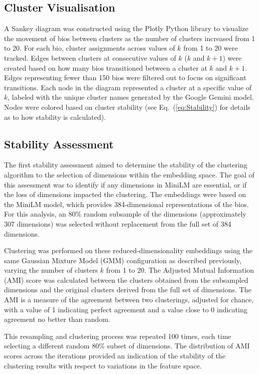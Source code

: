 \documentclass{article}
\begin{document}
\subsection*{Cluster Visualisation}

A Sankey diagram was constructed using the Plotly Python library to visualize the movement of bios between clusters as the number of clusters increased from 1 to 20. For each bio, cluster assignments across values of $k$ from 1 to 20 were tracked. Edges between clusters at consecutive values of $k$ ($k$ and $k+1$) were created based on how many bios transitioned between a cluster at $k$ and $k + 1$. Edges representing fewer than 150 bios were filtered out to focus on significant transitions. Each node in the diagram represented a cluster at a specific value of $k$, labeled with the unique cluster names generated by the Google Gemini model. Nodes were colored based on cluster stability (see Eq.~(\ref{eq:Stability}) for details as to how stability is calculated).




\subsection*{Stability Assessment}

The first stability assessment aimed to determine the stability of the clustering algorithm to the selection of dimensions within the embedding space.  The goal of this assessment was to identify if any dimensions in MiniLM are essential, or if the loss of dimensions impacted the clustering. The embeddings were based on the MiniLM model, which provides 384-dimensional representations of the bios. For this analysis, an 80\% random subsample of the dimensions (approximately 307 dimensions) was selected without replacement from the full set of 384 dimensions.

Clustering was performed on these reduced-dimensionality embeddings using the same Gaussian Mixture Model (GMM) configuration as described previously, varying the number of clusters $k$ from 1 to 20. The Adjusted Mutual Information (AMI) score was calculated between the clusters obtained from the subsampled dimensions and the original clusters derived from the full set of dimensions. 
The AMI is a measure of the agreement between two clusterings, adjusted for chance, with a value of 1 indicating perfect agreement and a value close to 0 indicating agreement no better than random.

This resampling and clustering process was repeated 100 times, each time selecting a different random 80\% subset of dimensions. The distribution of AMI scores across the iterations provided an indication of the stability of the clustering results with respect to variations in the feature space.
\end{document}
